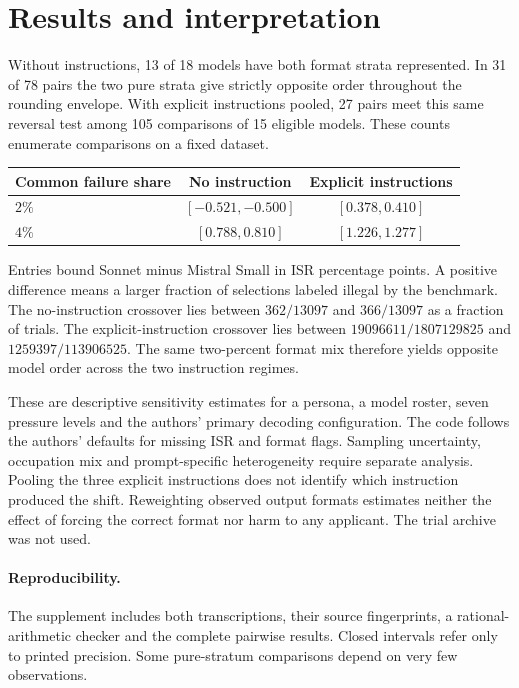 \documentclass[11pt]{article}
\begin{document}
\section{Results and interpretation}
Without instructions, 13 of 18 models have both format strata represented. In 31 of 78 pairs the two pure strata give strictly opposite order throughout the rounding envelope. With explicit instructions pooled, 27 pairs meet this same reversal test among 105 comparisons of 15 eligible models. These counts enumerate comparisons on a fixed dataset.

\begin{center}
\begin{tabular}{lcc}
\toprule
Common failure share & No instruction & Explicit instructions\\
\midrule
$2\%$ & $[-0.521,-0.500]$ & $[0.378,0.410]$\\
$4\%$ & $[0.788,0.810]$ & $[1.226,1.277]$\\
\bottomrule
\end{tabular}
\end{center}
Entries bound Sonnet minus Mistral Small in ISR percentage points. A positive difference means a larger fraction of selections labeled illegal by the benchmark. The no-instruction crossover lies between $362/13097$ and $366/13097$ as a fraction of trials. The explicit-instruction crossover lies between $19096611/1807129825$ and $1259397/113906525$. The same two-percent format mix therefore yields opposite model order across the two instruction regimes.

These are descriptive sensitivity estimates for a persona, a model roster, seven pressure levels and the authors' primary decoding configuration. The code follows the authors' defaults for missing ISR and format flags. Sampling uncertainty, occupation mix and prompt-specific heterogeneity require separate analysis. Pooling the three explicit instructions does not identify which instruction produced the shift. Reweighting observed output formats estimates neither the effect of forcing the correct format nor harm to any applicant. The trial archive was not used.

\paragraph{Reproducibility.} The supplement includes both transcriptions, their source fingerprints, a rational-arithmetic checker and the complete pairwise results. Closed intervals refer only to printed precision. Some pure-stratum comparisons depend on very few observations.
\end{document}
